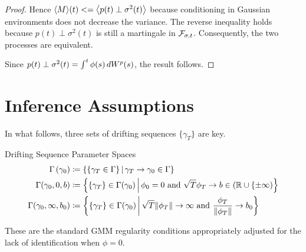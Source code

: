 \documentclass[11pt, letterpaper, twoside, final]{article}
\begin{document}
\begin{appendices}
\begin{proof}
    Hence $\predQV*{M}(t) <= \predQV*{p(t) \perp \sigma^2(t)}$ because conditioning in Gaussian environments does
    not decrease the variance.
    The reverse inequality holds because $p(t) \perp \sigma^2(t)$ is still a martingale in $\mathcal{F}_{\sigma,t}$.
    Consequently, the two processes are equivalent.
   
    Since $p(t) \perp \sigma^2(t) = \int^t \phi(s) \mathop{}\!d W^{p}(s)$, the result follows.


\end{proof}

\section{Inference Assumptions}

    In what follows, three sets of drifting sequences $\lbrace \gamma_T \rbrace$ are key. 
    
    \begin{defn}{Drifting Sequence Parameter Spaces}
        \begin{align}
            \Gamma\left(\gamma_0\right) &\coloneqq \left\lbrace \left\lbrace \gamma_T \in \Gamma \right\rbrace
            \mvert \gamma_T \to \gamma_0 \in \Gamma \right\rbrace\\ 
            \Gamma(\gamma_0, 0, b) &\coloneqq \left\lbrace \lbrace \gamma_T \rbrace \in \Gamma(\gamma_0) \mvert
            \phi_0 = 0\ \text{and}\ \sqrt{T} \phi_T \to b \in (\R \cup \lbrace \pm \infty) \right\rbrace \\
            \Gamma(\gamma_0, \infty, b_0) &\coloneqq \left\lbrace \lbrace \gamma_T \rbrace \in \Gamma (\gamma_0)
            \mvert \sqrt{T} \norm{\phi_T} \to \infty\ \text{and}\ \frac{\phi_T}{\norm{\phi_T}} \to b_0
            \right\rbrace 
        \end{align}
    \end{defn}
    
    These are the standard GMM regularity conditions appropriately adjusted for the lack of identification when
    $\phi =0$.
    

\end{appendices}
\end{document}
